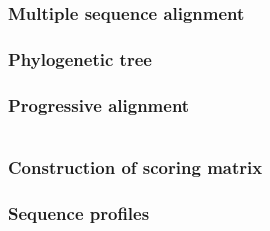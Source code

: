 \documentclass[12pt]{article}
\begin{document}
\newpage

%
%
\part{}

%
%
\setcounter{figure}{0}
\setcounter{table}{0}
\section{Multiple sequence alignment}



\newpage

%
%
\setcounter{figure}{0}
\setcounter{table}{0}
\section{Phylogenetic tree}






\newpage

%
%
\setcounter{section}{9}
\setcounter{figure}{0}
\setcounter{table}{0}
\section{Progressive alignment}





\newpage

%
%
\part{}

%
%
\setcounter{figure}{0}
\setcounter{table}{0}
\section{Construction of scoring matrix}





\newpage

%
%
\setcounter{figure}{0}
\setcounter{table}{0}
\section{Sequence profiles}





\end{document}
